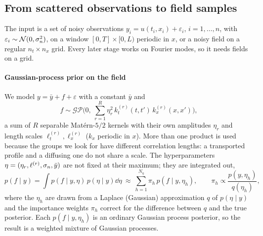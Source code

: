 \subsection{From scattered observations to field samples}\label{sec:alg-interp}
The input is a set of noisy observations $y_i=u(t_i,x_i)+\varepsilon_i$, $i=1,\dots,n$, with
$\varepsilon_i\sim\mathcal{N}(0,\sigma_{n}^2)$, on a window $[0,T]\times[0,L)$ periodic in $x$, or a noisy field on a
regular $n_t\times n_x$ grid. Every later stage works on Fourier modes, so it needs fields on a grid.

\paragraph{Gaussian-process prior on the field}
We model $y=\bar y+f+\varepsilon$ with a constant $\bar y$ and
\begin{equation}\label{eq:gp}
  f\sim\mathcal{GP}\Big(0,\ \sum_{r=1}^{R}\eta_r^2\,k_t^{(r)}(t,t')\,k_x^{(r)}(x,x')\Big),
\end{equation}
a sum of $R$ separable Mat\'ern-$5/2$ kernels with their own amplitudes $\eta_r$ and length scales
$\ell_t^{(r)},\ell_x^{(r)}$ ($k_x$ periodic in $x$). More than one product is used because the groups we
look for have different correlation lengths: a transported profile and a diffusing one do not share a
scale. The hyperparameters $\eta=(\eta_r,\ell^{(r)},\sigma_{n},\bar y)$ are not fixed at their maximum; they are integrated out,
\begin{equation}\label{eq:marginal-eta}
  p(f\mid y)=\int p(f\mid y,\eta)\,p(\eta\mid y)\dd\eta\ \approx\ \sum_{h=1}^{N_\eta}\pi_h\,p(f\mid y,\eta_h),
  \qquad \pi_h\propto\frac{p(y,\eta_h)}{q(\eta_h)},
\end{equation}
where the $\eta_h$ are drawn from a Laplace (Gaussian) approximation $q$ of $p(\eta\mid y)$ and the importance weights
$\pi_h$ correct for the difference between $q$ and the true posterior. Each $p(f\mid y,\eta_h)$ is an ordinary Gaussian
process posterior, so the result is a weighted mixture of Gaussian processes.

